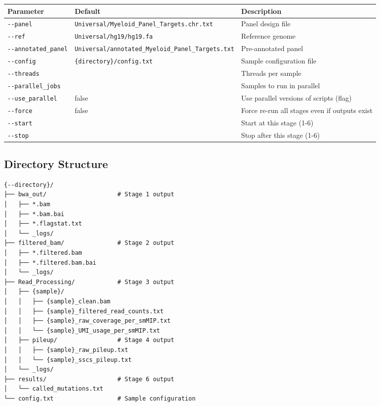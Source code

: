 \documentclass[
]{article}
\newcounter{none} %
\begin{document}
{\def\LTcaptype{none} %
\begin{longtable}[]{@{}
  >{\raggedright\arraybackslash}p{}
  >{\raggedright\arraybackslash}p{}
  >{\raggedright\arraybackslash}p{}@{}}
\toprule\noalign{}
\begin{minipage}[b]{\linewidth}\raggedright
Parameter
\end{minipage} & \begin{minipage}[b]{\linewidth}\raggedright
Default
\end{minipage} & \begin{minipage}[b]{\linewidth}\raggedright
Description
\end{minipage} \\
\midrule\noalign{}
\endhead
\bottomrule\noalign{}
\endlastfoot
\texttt{-\/-panel} & \texttt{Universal/Myeloid\_Panel\_Targets.chr.txt}
& Panel design file \\
\texttt{-\/-ref} & \texttt{Universal/hg19/hg19.fa} & Reference genome \\
\texttt{-\/-annotated\_panel} &
\texttt{Universal/annotated\_Myeloid\_Panel\_Targets.txt} &
Pre-annotated panel \\
\texttt{-\/-config} & \texttt{\{directory\}/config.txt} & Sample
configuration file \\
\texttt{-\/-threads} & 6 & Threads per sample \\
\texttt{-\/-parallel\_jobs} & 4 & Samples to run in parallel \\
\texttt{-\/-use\_parallel} & false & Use parallel versions of scripts
(flag) \\
\texttt{-\/-force} & false & Force re-run all stages even if outputs
exist \\
\texttt{-\/-start} & 1 & Start at this stage (1-6) \\
\texttt{-\/-stop} & 6 & Stop after this stage (1-6) \\
\end{longtable}
}

\subsection{Directory Structure}\label{directory-structure}

\begin{verbatim}
{--directory}/
├── bwa_out/                    # Stage 1 output
│   ├── *.bam
│   ├── *.bam.bai
│   ├── *.flagstat.txt
│   └── _logs/
├── filtered_bam/               # Stage 2 output
│   ├── *.filtered.bam
│   ├── *.filtered.bam.bai
│   └── _logs/
├── Read_Processing/            # Stage 3 output
│   ├── {sample}/
│   │   ├── {sample}_clean.bam
│   │   ├── {sample}_filtered_read_counts.txt
│   │   ├── {sample}_raw_coverage_per_smMIP.txt
│   │   └── {sample}_UMI_usage_per_smMIP.txt
│   ├── pileup/                 # Stage 4 output
│   │   ├── {sample}_raw_pileup.txt
│   │   └── {sample}_sscs_pileup.txt
│   └── _logs/
├── results/                    # Stage 6 output
│   └── called_mutations.txt
└── config.txt                  # Sample configuration
\end{verbatim}
\end{document}
